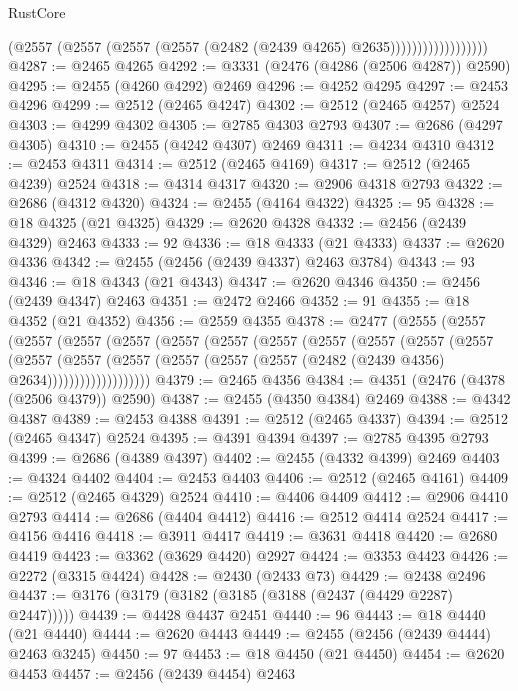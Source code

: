 \begin{lexlean}{RustCore}
\begin{coremodule}
                              (@2557
                                (@2557 (@2557 (@2557 (@2482 (@2439 @4265) @2635))))))))))))))))))
@4287 := @2465 @4265
@4292 := @3331 (@2476 (@4286 (@2506 @4287)) @2590)
@4295 := @2455 (@4260 @4292) @2469
@4296 := @4252 @4295
@4297 := @2453 @4296
@4299 := @2512 (@2465 @4247)
@4302 := @2512 (@2465 @4257) @2524
@4303 := @4299 @4302
@4305 := @2785 @4303 @2793
@4307 := @2686 (@4297 @4305)
@4310 := @2455 (@4242 @4307) @2469
@4311 := @4234 @4310
@4312 := @2453 @4311
@4314 := @2512 (@2465 @4169)
@4317 := @2512 (@2465 @4239) @2524
@4318 := @4314 @4317
@4320 := @2906 @4318 @2793
@4322 := @2686 (@4312 @4320)
@4324 := @2455 (@4164 @4322)
@4325 := 95
@4328 := @18 @4325 (@21 @4325)
@4329 := @2620 @4328
@4332 := @2456 (@2439 @4329) @2463
@4333 := 92
@4336 := @18 @4333 (@21 @4333)
@4337 := @2620 @4336
@4342 := @2455 (@2456 (@2439 @4337) @2463 @3784)
@4343 := 93
@4346 := @18 @4343 (@21 @4343)
@4347 := @2620 @4346
@4350 := @2456 (@2439 @4347) @2463
@4351 := @2472 @2466
@4352 := 91
@4355 := @18 @4352 (@21 @4352)
@4356 := @2559 @4355
@4378 := @2477
    (@2555
      (@2557
        (@2557
          (@2557
            (@2557
              (@2557
                (@2557
                  (@2557
                    (@2557
                      (@2557
                        (@2557
                          (@2557
                            (@2557
                              (@2557
                                (@2557
                                  (@2557 (@2557 (@2557 (@2482 (@2439 @4356) @2634)))))))))))))))))))
@4379 := @2465 @4356
@4384 := @4351 (@2476 (@4378 (@2506 @4379)) @2590)
@4387 := @2455 (@4350 @4384) @2469
@4388 := @4342 @4387
@4389 := @2453 @4388
@4391 := @2512 (@2465 @4337)
@4394 := @2512 (@2465 @4347) @2524
@4395 := @4391 @4394
@4397 := @2785 @4395 @2793
@4399 := @2686 (@4389 @4397)
@4402 := @2455 (@4332 @4399) @2469
@4403 := @4324 @4402
@4404 := @2453 @4403
@4406 := @2512 (@2465 @4161)
@4409 := @2512 (@2465 @4329) @2524
@4410 := @4406 @4409
@4412 := @2906 @4410 @2793
@4414 := @2686 (@4404 @4412)
@4416 := @2512 @4414 @2524
@4417 := @4156 @4416
@4418 := @3911 @4417
@4419 := @3631 @4418
@4420 := @2680 @4419
@4423 := @3362 (@3629 @4420) @2927
@4424 := @3353 @4423
@4426 := @2272 (@3315 @4424)
@4428 := @2430 (@2433 @73)
@4429 := @2438 @2496
@4437 := @3176 (@3179 (@3182 (@3185 (@3188 (@2437 (@4429 @2287) @2447)))))
@4439 := @4428 @4437 @2451
@4440 := 96
@4443 := @18 @4440 (@21 @4440)
@4444 := @2620 @4443
@4449 := @2455 (@2456 (@2439 @4444) @2463 @3245)
@4450 := 97
@4453 := @18 @4450 (@21 @4450)
@4454 := @2620 @4453
@4457 := @2456 (@2439 @4454) @2463

\end{coremodule}
\end{lexlean}
